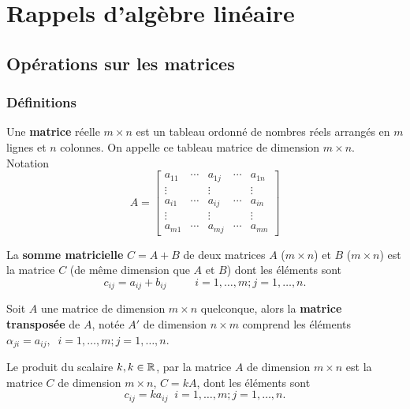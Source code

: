 
\chapter{Rappels d'algèbre linéaire}

\section{Opérations sur les matrices}

\subsection{Définitions}

\begin{defn}
Une \textbf{matrice} réelle $m\times n$ est un tableau ordonné de nombres réels arrangés en $m$ lignes et $n$ colonnes. On appelle ce tableau matrice de dimension $m \times n$. \\
Notation
$$
A=\left[ \begin{array}{ccccc}
a_{11} & \cdots & a_{1j} & \cdots & a_{1n} \\
\vdots &         & \vdots &           & \vdots \\
a_{i1} &  \cdots       &  a_{ij} & \cdots & a_{in} \\
\vdots &         & \vdots &           & \vdots \\
a_{m1} &  \cdots & a_{mj}& \cdots & a_{mn}
\end{array}
\right]
$$
\end{defn}

\begin{defn}
La \textbf{somme matricielle} $C=A+B$ de deux matrices $A$ ($m\times n$) et $B$ ($m\times n$) est la matrice $C$ (de même dimension que $A$ et $B$) dont les éléments sont
$$c_{ij}=a_{ij}+b_{ij}\qquad\;\;i=1,\ldots,m; j=1,\ldots,n.$$
\end{defn}

\begin{defn}
Soit $A$ une matrice de dimension $m\times n$ quelconque, alors la \textbf{matrice transposée} de $A$, notée $A'$ de dimension $n\times m$ comprend les éléments $\alpha_{ji}=a_{ij},\;\;i=1,\ldots,m; j=1,\ldots,n.$
\end{defn}

\begin{defn}
Le produit du scalaire $k, k\in\mathbb{R}$, par la matrice $A$ de dimension $m\times n$ est la matrice $C$ de dimension $m\times n$, $C=kA$, dont les éléments sont
$$c_{ij}=ka_{ij}\;\;i=1,\ldots,m; j=1,\ldots,n.$$
\end{defn}

